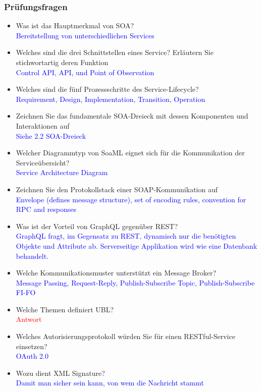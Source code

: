 \subsubsection{Prüfungsfragen}

\begin{itemize}
    \item Was ist das Hauptmerkmal von SOA? \\
    \textcolor{blue}{Bereitstellung von unterschiedlichen
    Services}
    \item Welches sind die drei Schnittstellen eines Service? Erläutern Sie stichwortartig deren Funktion \\
    \textcolor{blue}{Control API, API, und Point of Observation}
    \item Welches sind die fünf Prozessschritte des Service-Lifecycle? \\
    \textcolor{blue}{Requirement, Design, Implementation, Transition, Operation}
    \item Zeichnen Sie das fundamentale SOA-Dreieck mit dessen Komponenten und Interaktionen auf \\
    \textcolor{blue}{Siehe 2.2 SOA-Dreieck}
    \item Welcher Diagrammtyp von SoaML eignet sich für die Kommunikation der Serviceübersicht? \\
    \textcolor{blue}{Service Architecture Diagram}
    \item Zeichnen Sie den Protokollstack einer SOAP-Kommunikation auf \\
    \textcolor{blue}{Envelope (defines message structure), set of encoding rules,     convention for RPC and responses}
    \item Was ist der Vorteil von GraphQL gegenüber REST? \\
    \textcolor{blue}{GraphQL fragt, im Gegensatz zu REST, dynamisch nur die benötigten Objekte und Attribute ab. Serverseitige Applikation wird wie eine Datenbank behandelt.}
    \item Welche Kommunikationsmuster unterstützt ein Message Broker? \\
    \textcolor{blue}{Message Passing, Request-Reply, Publish-Subscribe Topic, Publish-Subscribe FI-FO}
    \item Welche Themen definiert UBL? \\
    \textcolor{red}{Antwort}
    \item Welches Autorisierungsprotokoll würden Sie für einen RESTful-Service einsetzen? \\
    \textcolor{blue}{OAuth 2.0}
    \item Wozu dient XML Signature? \\
    \textcolor{blue}{Damit man sicher sein kann, von wem die Nachricht stammt}
\end{itemize}


